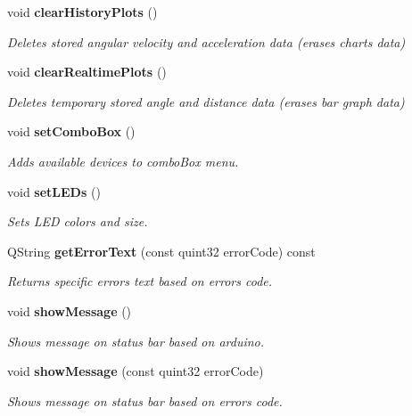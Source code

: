 \begin{DoxyCompactItemize}
$$void \textbf{ clear\+History\+Plots} ()
\begin{DoxyCompactList}\small\item\em Deletes stored angular velocity and acceleration data (erases charts data) \end{DoxyCompactList}\item 
void \textbf{ clear\+Realtime\+Plots} ()
\begin{DoxyCompactList}\small\item\em Deletes temporary stored angle and distance data (erases bar graph data) \end{DoxyCompactList}\item 
void \textbf{ set\+Combo\+Box} ()
\begin{DoxyCompactList}\small\item\em Adds available devices to combo\+Box menu. \end{DoxyCompactList}\item 
void \textbf{ set\+L\+E\+Ds} ()
\begin{DoxyCompactList}\small\item\em Sets L\+ED colors and size. \end{DoxyCompactList}\item 
Q\+String \textbf{ get\+Error\+Text} (const quint32 error\+Code) const
\begin{DoxyCompactList}\small\item\em Returns specific error\textquotesingle{}s text based on error\textquotesingle{}s code. \end{DoxyCompactList}\item 
void \textbf{ show\+Message} ()
\begin{DoxyCompactList}\small\item\em Shows message on status bar based on arduino. \end{DoxyCompactList}\item 
void \textbf{ show\+Message} (const quint32 error\+Code)
\begin{DoxyCompactList}\small\item\em Shows message on status bar based on error\textquotesingle{}s code. \end{DoxyCompactList}\end{DoxyCompactItemize}
